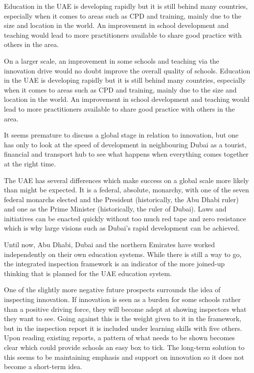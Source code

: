 \documentclass[11pt]{article}
\begin{document}
Education in the UAE is developing rapidly but it is still behind many countries, especially when it comes to areas such as CPD and training, mainly due to the size and location in the world. An improvement in school development and teaching would lead to more practitioners available to share good practice with others in the area.

On a larger scale, an improvement in some schools and teaching via the innovation drive would no doubt improve the overall quality of schools. Education in the UAE is developing rapidly but it is still behind many countries, especially when it comes to areas such as CPD and training, mainly due to the size and location in the world. An improvement in school development and teaching would lead to more practitioners available to share good practice with others in the area.

It seems premature to discuss a global stage in relation to innovation, but one has only to look at the speed of development in neighbouring Dubai as a tourist, financial and transport hub to see what happens when everything comes together at the right time.

The UAE has several differences which make success on a global scale more likely than might be expected. It is a federal, absolute, monarchy, with one of the seven federal monarchs elected and the President (historically, the Abu Dhabi ruler) and one as the Prime Minister (historically, the ruler of Dubai). Laws and initiatives can be enacted quickly without too much red tape and zero resistance which is why large visions such as Dubai's rapid development can be achieved.

Until now, Abu Dhabi, Dubai and the northern Emirates have worked independently on their own education systems. While there is still a way to go, the integrated inspection framework is an indicator of the more joined-up thinking that is planned for the UAE education system. 

One of the slightly more negative future prospects surrounds the idea of inspecting innovation. If innovation is seen as a burden for some schools rather than a positive driving force, they will become adept at showing inspectors what they want to see. Going against this is the weight given to it in the framework, but in the inspection report it is included under learning skills with five others. Upon reading existing reports, a pattern of what needs to be shown becomes clear which could provide schools an easy box to tick. The long-term solution to this seems to be maintaining emphasis and support on innovation so it does not become a short-term idea. 
\end{document}
